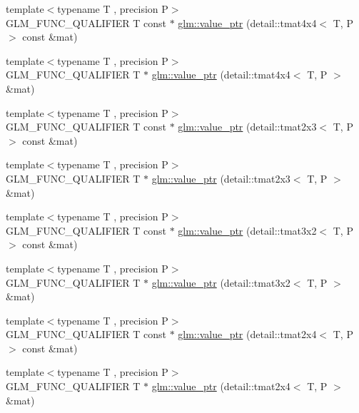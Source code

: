 \begin{DoxyCompactItemize}
\item 
{\footnotesize template$<$typename T , precision P$>$ }\\G\-L\-M\-\_\-\-F\-U\-N\-C\-\_\-\-Q\-U\-A\-L\-I\-F\-I\-E\-R T const $\ast$ \hyperlink{group__gtc__type__ptr_gaa99522f78635f6949ebf82f065bafa94}{glm\-::value\-\_\-ptr} (detail\-::tmat4x4$<$ T, P $>$ const \&mat)
\item 
{\footnotesize template$<$typename T , precision P$>$ }\\G\-L\-M\-\_\-\-F\-U\-N\-C\-\_\-\-Q\-U\-A\-L\-I\-F\-I\-E\-R T $\ast$ \hyperlink{group__gtc__type__ptr_ga46c85fe444b7260c496be5fe0c146e87}{glm\-::value\-\_\-ptr} (detail\-::tmat4x4$<$ T, P $>$ \&mat)
\item 
{\footnotesize template$<$typename T , precision P$>$ }\\G\-L\-M\-\_\-\-F\-U\-N\-C\-\_\-\-Q\-U\-A\-L\-I\-F\-I\-E\-R T const $\ast$ \hyperlink{group__gtc__type__ptr_gad5c4faad7a4553c875bc45656fcae73c}{glm\-::value\-\_\-ptr} (detail\-::tmat2x3$<$ T, P $>$ const \&mat)
\item 
{\footnotesize template$<$typename T , precision P$>$ }\\G\-L\-M\-\_\-\-F\-U\-N\-C\-\_\-\-Q\-U\-A\-L\-I\-F\-I\-E\-R T $\ast$ \hyperlink{group__gtc__type__ptr_gaaba8179ff5559d8b4493499313eb7a02}{glm\-::value\-\_\-ptr} (detail\-::tmat2x3$<$ T, P $>$ \&mat)
\item 
{\footnotesize template$<$typename T , precision P$>$ }\\G\-L\-M\-\_\-\-F\-U\-N\-C\-\_\-\-Q\-U\-A\-L\-I\-F\-I\-E\-R T const $\ast$ \hyperlink{group__gtc__type__ptr_gaf8edbe29063a5b8221fc8afcb6af224d}{glm\-::value\-\_\-ptr} (detail\-::tmat3x2$<$ T, P $>$ const \&mat)
\item 
{\footnotesize template$<$typename T , precision P$>$ }\\G\-L\-M\-\_\-\-F\-U\-N\-C\-\_\-\-Q\-U\-A\-L\-I\-F\-I\-E\-R T $\ast$ \hyperlink{group__gtc__type__ptr_gae2e604002202417c7156db3deeb1301d}{glm\-::value\-\_\-ptr} (detail\-::tmat3x2$<$ T, P $>$ \&mat)
\item 
{\footnotesize template$<$typename T , precision P$>$ }\\G\-L\-M\-\_\-\-F\-U\-N\-C\-\_\-\-Q\-U\-A\-L\-I\-F\-I\-E\-R T const $\ast$ \hyperlink{group__gtc__type__ptr_ga7b738eac576043c00c39bda2fc515d7b}{glm\-::value\-\_\-ptr} (detail\-::tmat2x4$<$ T, P $>$ const \&mat)
\item 
{\footnotesize template$<$typename T , precision P$>$ }\\G\-L\-M\-\_\-\-F\-U\-N\-C\-\_\-\-Q\-U\-A\-L\-I\-F\-I\-E\-R T $\ast$ \hyperlink{group__gtc__type__ptr_ga59b17271f4f487e556383b715f9b8534}{glm\-::value\-\_\-ptr} (detail\-::tmat2x4$<$ T, P $>$ \&mat)

\end{DoxyCompactItemize}
